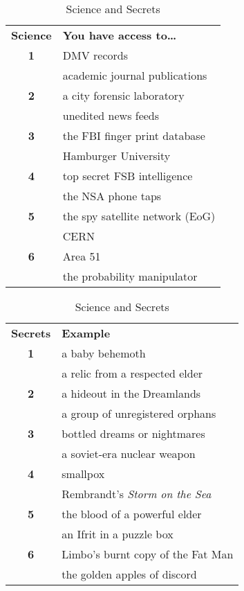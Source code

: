 \begin{table}[htb]
\caption{Science and Secrets}
\begin{minipage}{0.4\textwidth}
\begin{tabular}{c l}
\textbf{Science} & \textbf{You have access to\ldots{} }\\
\textbf{1}  &    DMV records\\
& academic journal publications\\
\textbf{2}  &    a city forensic laboratory\\
& unedited news feeds\\
\textbf{3}  &    the FBI finger print database\\
& Hamburger University\\
\textbf{4}  &    top secret FSB intelligence \\
& the NSA phone taps\\
\textbf{5}  &    the spy satellite network (EoG)\\
& CERN\\
\textbf{6}  &    Area 51\\
& the probability manipulator\\
\end{tabular}
\end{minipage}
\hspace{1.1cm}
\begin{minipage}{0.4\textwidth}
\begin{tabular}{c l}
\textbf{Secrets} & \textbf{Example}\\
\textbf{1}  &    a baby behemoth\\
& a relic from a respected elder\\
\textbf{2}  &    a hideout in the Dreamlands\\
& a group of unregistered orphans\\
\textbf{3}  &    bottled dreams or nightmares\\
& a soviet-era nuclear weapon\\
\textbf{4}  &    smallpox\\
& Rembrandt's \textit{Storm on the Sea}\\
\textbf{5}  &    the blood of a powerful elder\\
& an Ifrit in a puzzle box\\
\textbf{6}  &    Limbo's burnt copy of the Fat Man\\
& the golden apples of discord\\
\end{tabular}
\end{minipage}
\end{table}

